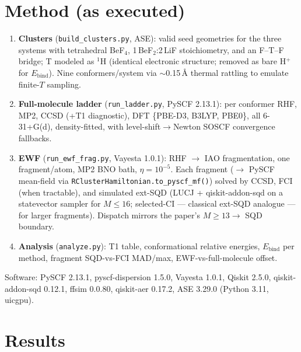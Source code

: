 \documentclass[11pt]{article}
\begin{document}
\section{Method (as executed)}
\begin{enumerate}[nosep]
  \item \textbf{Clusters} (\texttt{build\_clusters.py}, ASE): valid seed geometries for the
  three systems with tetrahedral BeF$_4$, 1\,BeF$_2$:2\,LiF stoichiometry, and an F--T--F
  bridge; T modeled as $^1$H (identical electronic structure; removed as bare H$^+$ for
  $E_{\mathrm{bind}}$). Nine conformers/system via $\sim$0.15\,\AA{} thermal rattling to
  emulate finite-$T$ sampling.
  \item \textbf{Full-molecule ladder} (\texttt{run\_ladder.py}, PySCF 2.13.1): per conformer
  RHF, MP2, CCSD (+T1 diagnostic), DFT \{PBE-D3, B3LYP, PBE0\}, all 6-31+G(d), density-fitted,
  with level-shift$\to$Newton SOSCF convergence fallbacks.
  \item \textbf{EWF} (\texttt{run\_ewf\_frag.py}, Vayesta 1.0.1): RHF $\to$ IAO fragmentation,
  one fragment/atom, MP2 BNO bath, $\eta=10^{-5}$. Each fragment ($\to$ PySCF mean-field via
  \texttt{RClusterHamiltonian.to\_pyscf\_mf()}) solved by CCSD, FCI (when tractable), and
  simulated ext-SQD (LUCJ + qiskit-addon-sqd on a statevector sampler for $M\le16$;
  selected-CI --- classical ext-SQD analogue --- for larger fragments). Dispatch mirrors the
  paper's $M\ge13\to$ SQD boundary.
  \item \textbf{Analysis} (\texttt{analyze.py}): T1 table, conformational relative energies,
  $E_{\mathrm{bind}}$ per method, fragment SQD-vs-FCI MAD/max, EWF-vs-full-molecule offset.
\end{enumerate}
Software: PySCF 2.13.1, pyscf-dispersion 1.5.0, Vayesta 1.0.1, Qiskit 2.5.0,
qiskit-addon-sqd 0.12.1, ffsim 0.0.80, qiskit-aer 0.17.2, ASE 3.29.0 (Python 3.11, uicgpu).

\section{Results}

\end{document}
